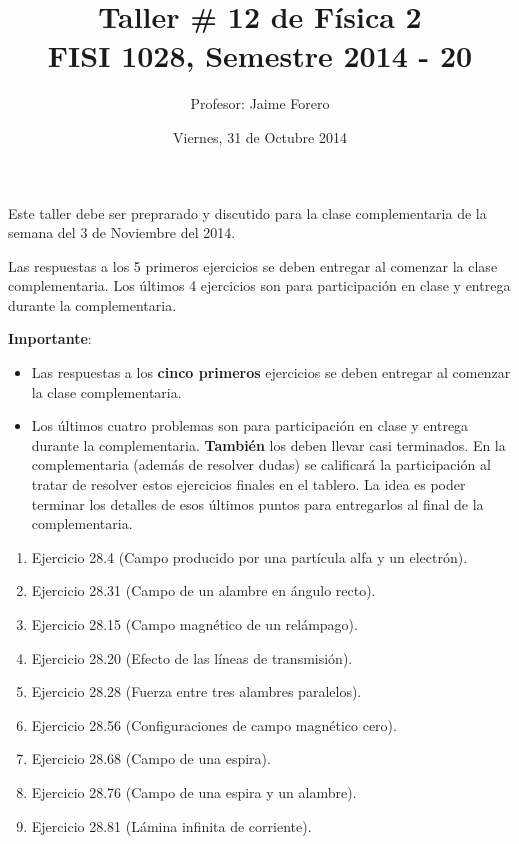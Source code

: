 \documentclass{article}
\title{Taller \# 12 de F\'isica 2\\ FISI 1028, Semestre 2014 - 20}
\author{Profesor: Jaime Forero}
\date{Viernes, 31 de Octubre 2014}
\begin{document}
\maketitle
\thispagestyle{empty}

\noindent



Este taller debe ser preprarado y discutido para la clase
complementaria de la semana del 3 de Noviembre del 2014.


Las respuestas a los 5 primeros ejercicios se deben entregar al comenzar la
clase complementaria. Los \'ultimos 4 ejercicios son para
participaci\'on en clase y entrega durante la complementaria. 


\noindent
{\bf Importante}:
\begin{itemize}

\item
Las respuestas a los {\bf cinco primeros} ejercicios se deben entregar
al comenzar la clase complementaria. 
\item 

Los \'ultimos cuatro problemas son para participaci\'on en clase y entrega
durante la complementaria. {\bf{Tambi\'en}} los deben llevar casi
terminados. En la complementaria (adem\'as de resolver dudas) se
calificar\'a la participaci\'on al tratar de resolver estos ejercicios
finales en el tablero. La idea es poder terminar los  detalles de esos
\'ultimos puntos para entregarlos al final de la complementaria.
\end{itemize}

\begin{enumerate}

\item
Ejercicio 28.4 (Campo producido por una part\'icula alfa y  un electr\'on).

\item
Ejercicio 28.31 (Campo de un alambre en \'angulo recto).

\item 
Ejercicio 28.15 (Campo magn\'etico de un rel\'ampago).

\item 
Ejercicio 28.20 (Efecto de las l\'ineas de transmisi\'on).

\item
Ejercicio 28.28 (Fuerza entre tres alambres paralelos).

\item 
Ejercicio 28.56 (Configuraciones de campo magn\'etico cero).

\item
Ejercicio 28.68 (Campo de una espira).

\item 
Ejercicio 28.76 (Campo de una espira y un alambre).

\item
Ejercicio 28.81 (L\'amina infinita de corriente).

\end{enumerate}
\end{document}

